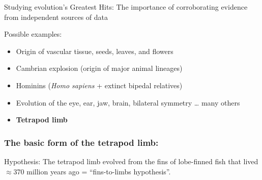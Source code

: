 \begin{noheadline}
\begin{frame}
    \begin{adjustwidth}{-2em}{-1.5em}
    Studying evolution's Greatest Hits: The importance of corroborating
    evidence from independent sources of data

    \vspace{3mm}
    Possible examples:
    \begin{itemize}
        \item<2-> Origin of vascular tissue, seeds, leaves, and flowers
        \item<2-> Cambrian explosion (origin of major animal lineages)
        \item<2-> Hominins (\textit{Homo sapiens} + extinct bipedal relatives)
        \item<2-> Evolution of the eye, ear, jaw, brain, bilateral symmetry \ldots
            many others
            \vspace{1ex}
        \item<3-> \textbf{Tetrapod limb}
    \end{itemize}

    \vspace{5mm}

    \end{adjustwidth}
\end{frame}
\end{noheadline}

\begin{frame}[b]
    \frametitle{The basic form of the tetrapod limb:}
    \begin{adjustwidth}{-2em}{-1.5em}


        Hypothesis: The tetrapod limb evolved from the fins of lobe-finned fish
        that lived $\approx$370 million years ago = ``fins-to-limbs
        hypothesis''.
    \end{adjustwidth}
\end{frame}

